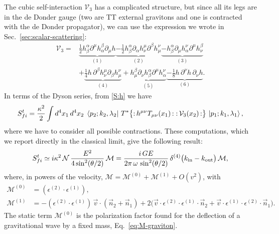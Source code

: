 \documentclass[12pt,a4paper,oneside]{article}
\numberwithin{equation}{section}   %
\begin{document}
The cubic self-interaction $\mathcal V_3$ has a
complicated structure, but since all its legs are
in the de Donder gauge (two are
TT external gravitons and one is contracted with the de Donder propagator),
we can use the expression we wrote in
Sec.~\ref{sec:scalar-scattering}:
\begin{equation}
\begin{split}
\mathcal V_3 ={}&
\underbrace{\tfrac{1}{2} h_\beta^\alpha \partial^\mu h_\alpha^\beta \partial_\mu h}_{(1)}
\underbrace{- \tfrac{1}{2} h_\beta^\alpha \partial_\alpha h_\nu^\mu \partial^\beta h_\mu^\nu}_{(2)}
\underbrace{- h_\beta^\alpha \partial_\mu h_\alpha^\nu \partial^\mu h_\nu^\beta}_{(3)}\\
&+ \underbrace{\tfrac{1}{4} h\, \partial^\beta h_\nu^\mu \partial_\beta h_\mu^\nu}_{(4)}
+ \underbrace{h_\mu^\beta \partial_\nu h_\beta^\alpha \partial^\mu h_\alpha^\nu}_{(5)}
\underbrace{- \tfrac{1}{8} h\, \partial^\nu h\, \partial_\nu h}_{(6)} .
\end{split}
\label{eq:V3}
\end{equation}
In terms of the Dyson series, from \eqref{S:h} we have
\begin{equation}
S^{t}_{fi}=\frac{\kappa^2}{2}\int d^4x_1\,d^4x_2\;
\bra{p_2;k_2,\lambda_2}\,T^*\bigl\{{:}\,h^{\mu\nu}T_{\mu\nu}(x_1)\,{:}\;
{:}\,\mathcal V_3(x_2)\,{:}\bigr\}\,\ket{p_1;k_1,\lambda_1},
\end{equation}
where we have to consider all possible contractions. These
computations, which we report directly in the classical limit,
give the following result:
\begin{equation}
S^{t}_{fi} \simeq
i\kappa^2\,\mathcal N\,\frac{E^2}{4\sin^2(\theta/2)}\,\mathcal M
=\frac{i\,G E}{2\pi\,\omega\,\sin^2(\theta/2)}\,
\delta^{(4)}\bigl(k_{\rm in}-k_{\rm out}\bigr)\,\mathcal M,
\label{eq:Mt}
\end{equation}
where, in powers of the velocity,
$\mathcal M=\mathcal M^{(0)}+\mathcal M^{(1)}+O(v^2)$, with
\begin{align}
\mathcal M^{(0)}&=(\epsilon^{(2)}\!\cdot\epsilon^{(1)}),
\label{eq:Mcal}\\
\mathcal M^{(1)}&=-(\epsilon^{(2)}\!\cdot\epsilon^{(1)})\,\vec v\!\cdot\!(\vec n_2+\vec n_1)
+2\bigl(\vec v\!\cdot\!\epsilon^{(2)}\!\cdot\!\epsilon^{(1)}\!\cdot\!\vec n_2
+\vec v\!\cdot\!\epsilon^{(1)}\!\cdot\!\epsilon^{(2)}\!\cdot\!\vec n_1\bigr).
\label{eq:Mcal1}
\end{align}
The static term $\mathcal M^{(0)}$ is the polarization factor found for the
deflection of a gravitational wave by a fixed mass, Eq.~\eqref{eq:M-graviton}.
\end{document}
